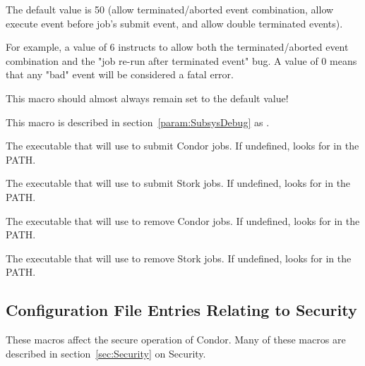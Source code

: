 \begin{description}
The default value is 50 (allow terminated/aborted event combination,
allow execute event before job's submit event, and allow double terminated
events).

For example, a value of 6 instructs  to allow both
the terminated/aborted event combination and the "job re-run
after terminated event" bug.  A value of 0 means that any "bad"
event will be considered a fatal error.

This macro should almost always remain set to the default value!

\item[\Macro{DAGMAN\_DEBUG}] \label{param:DAGManDebug} This macro
is described in section~\ref{param:SubsysDebug} as
.

\item[\Macro{DAGMAN\_CONDOR\_SUBMIT\_EXE}]
\label{param:DAGManCondorSubmitExe}
The executable that  will use to submit Condor jobs.
If undefined,  looks for  in the PATH.

\item[\Macro{DAGMAN\_STORK\_SUBMIT\_EXE}]
\label{param:DAGManStorkSubmitExe}
The executable that  will use to submit Stork jobs.
If undefined,  looks for  in the PATH.

\item[\Macro{DAGMAN\_CONDOR\_RM\_EXE}]
\label{param:DAGManCondorRmExe}
The executable that  will use to remove Condor jobs.
If undefined,  looks for  in the PATH.

\item[\Macro{DAGMAN\_STORK\_RM\_EXE}]
\label{param:DAGManStorkRmExe}
The executable that  will use to remove Stork jobs.
If undefined,  looks for  in the PATH.

\end{description}

\subsection{\label{sec:Config-Security}Configuration File Entries
Relating to Security}

These macros affect the secure operation of Condor.
Many of these macros are described in
section~\ref{sec:Security} on Security.

